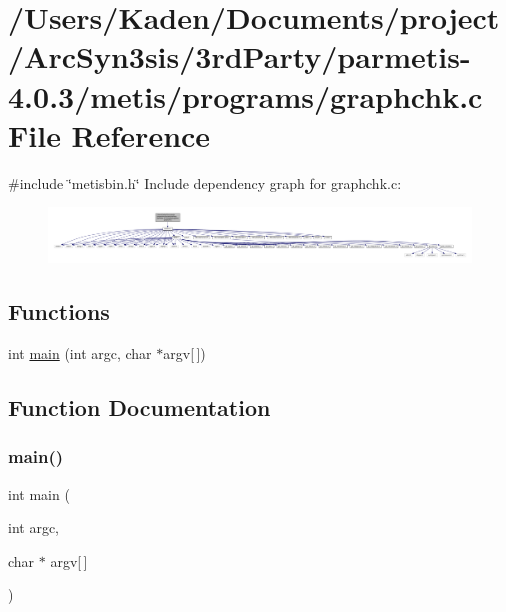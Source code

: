 \hypertarget{a00314}{}\section{/\+Users/\+Kaden/\+Documents/project/\+Arc\+Syn3sis/3rd\+Party/parmetis-\/4.0.3/metis/programs/graphchk.c File Reference}
\label{a00314}
{\ttfamily \#include \char`\"{}metisbin.\+h\char`\"{}}\newline
Include dependency graph for graphchk.\+c\+:\nopagebreak
\begin{figure}[H]
\begin{center}
\leavevmode
\includegraphics[width=350pt]{a00315}
\end{center}
\end{figure}
\subsection*{Functions}
\begin{DoxyCompactItemize}
\item 
int \hyperlink{a00314_a0ddf1224851353fc92bfbff6f499fa97}{main} (int argc, char $\ast$argv\mbox{[}$\,$\mbox{]})
\end{DoxyCompactItemize}


\subsection{Function Documentation}
\mbox{\label{a00314_a0ddf1224851353fc92bfbff6f499fa97}} 
\subsubsection{\texorpdfstring{main()}{main()}}
{\footnotesize\ttfamily int main (\begin{DoxyParamCaption}\item[{int}]{argc,  }\item[{char $\ast$}]{argv\mbox{[}$\,$\mbox{]} }\end{DoxyParamCaption})}

